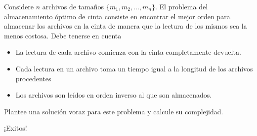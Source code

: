 \documentclass[10pt,twocolumn]{article}
\begin{document}
Considere $n$ archivos de tamaños $\{m_{1},m_ {2},...,m_{n}\}$. El problema del almacenamiento óptimo de cinta consiste en encontrar el mejor orden para almacenar los archivos en la cinta de manera que la lectura de los mismos sea la menos costosa. Debe tenerse en cuenta
	\begin{itemize}
		\item La lectura de cada archivo comienza con la cinta completamente devuelta.
		\item Cada lectura en un archivo toma un tiempo igual a la longitud de los archivos procedentes
		\item Los archivos son leídos en orden inverso al que son almacenados.
	\end{itemize}

Plantee una solución voraz para este problema y calcule su complejidad.

\begin{center}
	\huge{¡Exitos!}
\end{center}	
	
\end{document}
